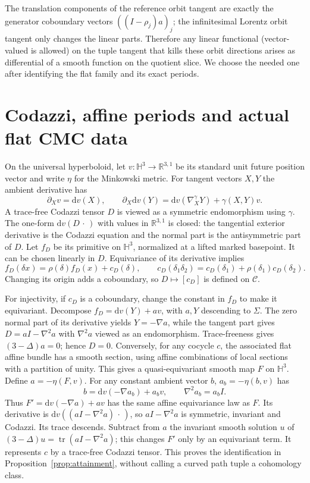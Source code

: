 \documentclass[11pt]{article}
\theoremstyle{remark}
\newcommand{\tr}{\operatorname{tr}}
\newcommand{\Mink}{\mathbb R^{3,1}}
\newcommand{\dd}{\mathrm{d}}
\newcommand{\C}{\mathcal C}
\begin{document}
The translation components of the reference orbit tangent are exactly the generator coboundary vectors \(((I-\rho_j)a)_j\); the infinitesimal Lorentz orbit tangent only changes the linear parts. Therefore any linear functional (vector-valued is allowed) on the tuple tangent that kills these orbit directions arises as differential of a smooth function on the quotient slice. We choose the needed one after identifying the flat family and its exact periods.

\section{Codazzi, affine periods and actual flat CMC data}\label{sec:flat}

On the universal hyperboloid, let \(v:\mathbb H^3\to\Mink\) be its standard unit future position vector and write \(\eta\) for the Minkowski metric. For tangent vectors \(X,Y\) the ambient derivative has
\[
   \partial_X v=\dd v(X),\qquad
   \partial_X\dd v(Y)=\dd v(\nabla^\gamma_XY)+\gamma(X,Y)v .
\]
A trace-free Codazzi tensor \(D\) is viewed as a symmetric endomorphism using \(\gamma\). The one-form \(\dd v(D\,\cdot\,)\) with values in \(\Mink\) is closed: the tangential exterior derivative is the Codazzi equation and the normal part is the antisymmetric part of \(D\). Let \(f_D\) be its primitive on \(\mathbb H^3\), normalized at a lifted marked basepoint. It can be chosen linearly in \(D\). Equivariance of its derivative implies
\begin{equation}
 f_D(\delta x)=\rho(\delta)f_D(x)+c_D(\delta),\qquad
 c_D(\delta_1\delta_2)=c_D(\delta_1)+\rho(\delta_1)c_D(\delta_2).
 \label{eq:cocycle}
\end{equation}
Changing its origin adds a coboundary, so \(D\mapsto[c_D]\) is defined on \(\C\).

For injectivity, if \(c_D\) is a coboundary, change the constant in \(f_D\) to make it equivariant. Decompose \(f_D=\dd v(Y)+a v\), with \(a,Y\) descending to \(\Sigma\). The zero normal part of its derivative yields \(Y=-\nabla a\), while the tangent part gives \(D=aI-\nabla^2 a\) with \(\nabla^2 a\) viewed as an endomorphism. Trace-freeness gives \((3-\Delta)a=0\); hence \(D=0\). Conversely, for any cocycle \(c\), the associated flat affine bundle has a smooth section, using affine combinations of local sections with a partition of unity. This gives a quasi-equivariant smooth map \(F\) on \(\mathbb H^3\). Define \(a=-\eta(F,v)\). For any constant ambient vector \(b\), \(a_b=-\eta(b,v)\) has
\[
 b=\dd v(-\nabla a_b)+a_bv,\qquad \nabla^2a_b=a_b I .
\]
Thus \(F'=\dd v(-\nabla a)+a v\) has the same affine equivariance law as \(F\). Its derivative is \(\dd v((aI-\nabla^2 a)\,\cdot\,)\), so \(aI-\nabla^2 a\) is symmetric, invariant and Codazzi. Its trace descends. Subtract from \(a\) the invariant smooth solution \(u\) of
\((3-\Delta)u=\tr(aI-\nabla^2a)\); this changes \(F'\) only by an equivariant term. It represents \(c\) by a trace-free Codazzi tensor. This proves the identification in Proposition~\ref{prop:attainment}, without calling a curved path tuple a cohomology class.
\end{document}
